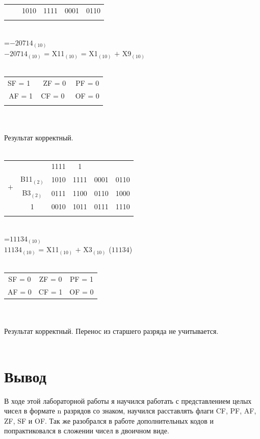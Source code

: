 \documentclass[11pt]{article}
\begin{document}
\begin{paracol}{2}
\begin{enumerate}
\begin{tabular}[t]{cccccc}
			\cline{2-6}
						       &        & 1010 & 1111 & 0001 & 0110\\
		\\
		\end{tabular}\\
		=$ -20714_{(10)}$\\
		\phantom{=}$ -20714_{(10)}$  = X11$_{(10)}$ = X1$_{(10)}$ $+$ X9$_{(10)}$\\\\
		\begin{tabular}{ccc}
			SF = 1\ & ZF = 0 & PF = 0 \\
			AF = 1 & CF = 0\ & OF = 0\\\\
		\end{tabular}\\\\
		Результат корректный. \\\\

		\begin{tabular}[t]{cccccc}
			&       &                                                1111&1\phantom{111}   &&\\
			\multirow{2}{*}{$+$} & B11$_{(2)}$ & 1010 & 1111 & 0001 & 0110\\
						          & B3$_{(2)}$\phantom{1} &  0111 &  1100 & 0110 & 1000\\
			\cline{2-6}
						       &        1& 0010 & 1011 & 0111 & 1110\\
		\\
		\end{tabular}\\
		=$11134_{(10)}$\\
		\phantom{=}$ 11134_{(10)}$  = X11$_{(10)}$ $+$ X3$_{(10)}$ ($11134$)\\\\
		\begin{tabular}{ccc}
			SF = 0 & ZF = 0 & PF = 1\\
			AF = 0 & CF = 1 & OF = 0\\
		\end{tabular}\\\\
		Результат корректный. Перенос из старшего разряда не учитывается.\\\\
\end{enumerate}
\end{paracol}
\section{Вывод}
В ходе этой лабораторной работы я научился работать с представлением целых чисел в формате n разрядов со знаком, научился расставлять флаги
CF, PF, AF, ZF, SF и OF. Так же разобрался в работе дополнительных кодов и попрактиковался в сложении чисел в двоичном виде.
\end{document}
